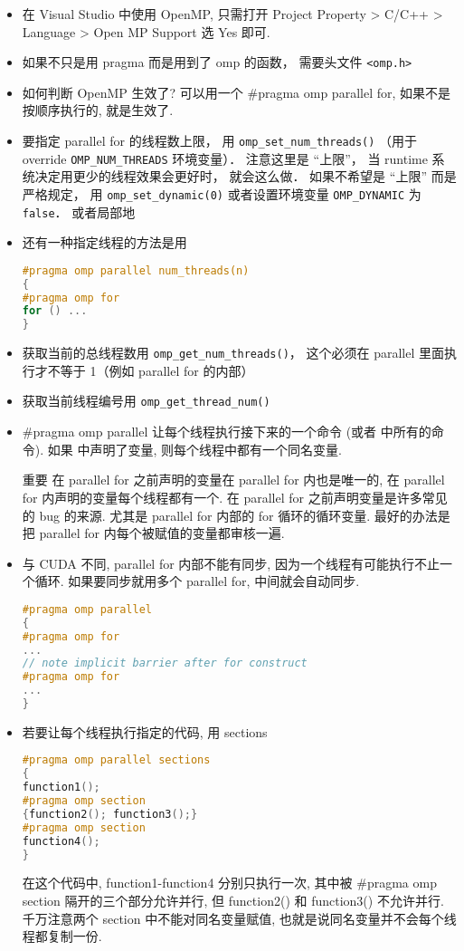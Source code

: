 
\begin{issues}
\issueDraft
\end{issues}


\begin{itemize}
\item 在 Visual Studio 中使用 OpenMP, 只需打开 Project Property > C/C++ > Language > Open MP Support 选 Yes 即可.
\item 如果不只是用 pragma 而是用到了 omp 的函数， 需要头文件 \verb`<omp.h>`
\item 如何判断 OpenMP 生效了? 可以用一个 #pragma omp parallel for, 如果不是按顺序执行的, 就是生效了.

\item 要指定 parallel for 的线程数上限， 用 \verb`omp_set_num_threads()` （用于 override \verb`OMP_NUM_THREADS` 环境变量）． 注意这里是 “上限”， 当 runtime 系统决定用更少的线程效果会更好时， 就会这么做． 如果不希望是 “上限” 而是严格规定， 用 \verb`omp_set_dynamic(0)` 或者设置环境变量 \verb`OMP_DYNAMIC` 为 \verb`false`．
 或者局部地
\item 还有一种指定线程的方法是用
\begin{lstlisting}[language=cpp]
#pragma omp parallel num_threads(n)
{
#pragma omp for
for () ...
}
\end{lstlisting}
\item 获取当前的总线程数用 \verb`omp_get_num_threads()`， 这个必须在 parallel 里面执行才不等于 1（例如 parallel for 的内部）
\item 获取当前线程编号用 \verb`omp_get_thread_num()`

\item #pragma omp parallel 让每个线程执行接下来的一个命令 (或者 {} 中所有的命令). 如果 {} 中声明了变量, 则每个线程中都有一个同名变量.
\item [重要] 在 parallel for 之前声明的变量在 parallel for 内也是唯一的, 在 parallel for 内声明的变量每个线程都有一个. 在 parallel for 之前声明变量是许多常见的 bug 的来源. 尤其是 parallel for 内部的 for 循环的循环变量. 最好的办法是把 parallel for 内每个被赋值的变量都审核一遍.
\item 与 CUDA 不同, parallel for 内部不能有同步, 因为一个线程有可能执行不止一个循环. 如果要同步就用多个 parallel for, 中间就会自动同步.
\begin{lstlisting}[language=cpp]
#pragma omp parallel
{
#pragma omp for
...
// note implicit barrier after for construct
#pragma omp for
...
}
\end{lstlisting}
\item 若要让每个线程执行指定的代码, 用 sections
\begin{lstlisting}[language=cpp]
#pragma omp parallel sections
{
function1();
#pragma omp section
{function2(); function3();}
#pragma omp section
function4();
}
\end{lstlisting}
在这个代码中, function1-function4 分别只执行一次, 其中被 #pragma omp section 隔开的三个部分允许并行, 但 function2() 和 function3() 不允许并行. 千万注意两个 section 中不能对同名变量赋值, 也就是说同名变量并不会每个线程都复制一份.


\end{itemize}
